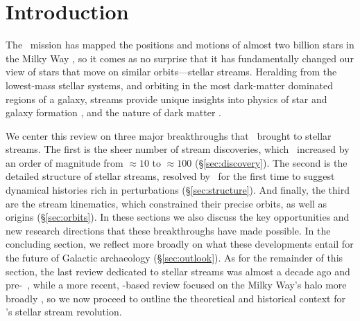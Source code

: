 \documentclass[final,5p,times,twocolumn,authoryear]{elsarticle}
\begin{document}
\begin{frontmatter}
\begin{keyword}



\end{keyword}

\end{frontmatter}


\section{Introduction}
\label{sec:intro}

The \gaia\ mission has mapped the positions and motions of almost two billion stars in the Milky Way \citep{gaiamission:2016, gaiadr1, gaiadr2, gaiaedr3, gaiadr3}, so it comes as no surprise that it has fundamentally changed our view of stars that move on similar orbits---stellar streams.
Heralding from the lowest-mass stellar systems, and orbiting in the most dark-matter dominated regions of a galaxy, streams provide unique insights into physics of star and galaxy formation \citep{smith:2016, ferguson:2016, carlin:2016}, and the nature of dark matter \citep{johnston:2016a, johnston:2016b}.


We center this review on three major breakthroughs that \gaia\ brought to stellar streams.
The first is the sheer number of stream discoveries, which \gaia\ increased by an order of magnitude from $\approx10$ to $\approx100$ (\S\ref{sec:discovery}).
The second is the detailed structure of stellar streams, resolved by \gaia\ for the first time to suggest dynamical histories rich in perturbations (\S\ref{sec:structure}).
And finally, the third are the stream kinematics, which constrained their precise orbits, as well as origins (\S\ref{sec:orbits}).
In these sections we also discuss the key opportunities and new research directions that these breakthroughs have made possible.
In the concluding section, we reflect more broadly on what these developments entail for the future of Galactic archaeology (\S\ref{sec:outlook}).
As for the remainder of this section, the last review dedicated to stellar streams was almost a decade ago and pre-\gaia\ \citep{newberg:2016}, while a more recent, \gaia-based review focused on the Milky Way's halo more broadly \citep{helmi:2020}, so we now proceed to outline the theoretical and historical context for \gaia's stellar stream revolution.
\end{document}
